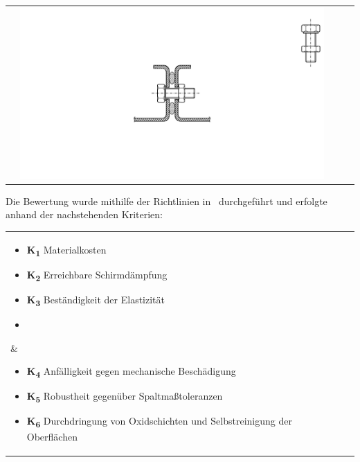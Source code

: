 \begin{longtable}{l p{6.55cm} p{6.55cm}}
\begin{minipage}{6.5cm}
        \end{minipage} &
        \noindent\begin{minipage}{6.5cm}
               \includegraphics[page=14, width=0.95\textwidth, trim = 10.5cm 8cm 13cm 5cm, clip]{Abbildungen/Kapitel3/Konzepte.pdf}
        \end{minipage} \\
\end{longtable}

Die Bewertung wurde mithilfe der Richtlinien in~\cite{EM_Schirmung, Design_of_shielded_enclosures} durchgeführt und erfolgte anhand der nachstehenden Kriterien:


\begin{tabular}{l l}
    \hspace*{0.5cm}\parbox[c]{6.5cm}{
        \begin{itemize}[]
            \item \textbf{K\textsubscript{1}} Materialkosten
            \item \textbf{K\textsubscript{2}} Erreichbare Schirmdämpfung
            \item \textbf{K\textsubscript{3}} Beständigkeit der Elastizität
            \item[]
        \end{itemize}
    }&
    \parbox[c]{8cm}{
        \begin{itemize}[]
            \item \textbf{K\textsubscript{4}} Anfälligkeit gegen mechanische Beschädigung
            \item \textbf{K\textsubscript{5}} Robustheit gegenüber Spaltmaßtoleranzen
            \item \textbf{K\textsubscript{6}} Durchdringung von Oxidschichten und Selbstreinigung der Oberflächen
        \end{itemize}
    }
\end{tabular}

